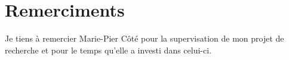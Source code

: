 \chapter*{Remerciments}
\label{chap:merci} 

Je tiens à remercier Marie-Pier Côté pour la supervisation de mon projet de recherche et pour le temps qu'elle a investi dans celui-ci.
